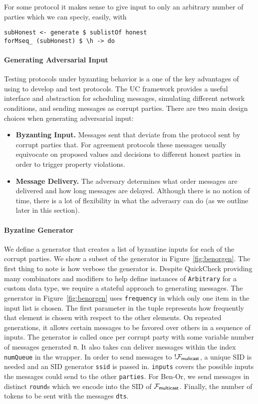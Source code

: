 For some protocol it makes sense to give input to only an arbitrary number of parties which we can speciy, easily, with 
\begin{lstlisting}
subHonest <- generate $ sublistOf honest
forMseq_ (subHonest) $ \h -> do
\end{lstlisting}

\paragraph{Generating Adversarial Input}
Testing protocols under byzanting behavior is a one of the key advantages of using \us to develop and test protocols. 
The UC framework provides a useful interface and abstraction for scheduling messages, simulating different network conditions, and sending messages as corrupt parties.  
There are two main design choices when generating adversarial input:
\begin{itemize}
\item \textbf{Byzanting Input.} Messages sent that deviate from the protocol sent by corrupt parties that. For agreement protocols these messages usually equivocate on proposed values and decisions to different honest parties in order to trigger property violations.
\item \textbf{Message Delivery.} The adversary determines what order messages are delivered and how long messages are delayed. Although there is no notion of time, there is a lot of flexibility in what the adverasry can do (as we outline later in this section).
\end{itemize}

\paragraph{Byzatine Generator}
We define a generator that creates a list of byzantine inputs for each of the corrupt parties.
We show a subset of the generator in Figure~\ref{fig:benorgen}.
The first thing to note is how verbose the generator is.
Despite QuickCheck providing many combinators and modifiers to help define instances of \texttt{Arbitrary} for a custom data type, we require a stateful approach to generating messages.
The generator in Figure~\ref{fig:benorgen} uses \texttt{frequency} in which only one item in the input list is chosen. 
The first parameter in the tuple represents how frequently that element is chosen with respect to the other elements.
On repeated generations, it allows certain messages to be favored over others in a sequence of inputs.
The generator is called once per corrupt party with some variable number of messages generated \texttt{n}. It also takes can deliver messages within the index \texttt{numQueue} in the wrapper.
In order to send messages to $!\mathcal{F}_{{\mathsf {mulicast}}}$, a unique SID is needed and an SID generator \texttt{ssid} is passed in. 
\texttt{inputs} covers the possible inputs the messages could send to the other \texttt{parties}. For Ben-Or, we send messages in distinct \texttt{round}s which we encode into the SID of $\mathcal{F}_{{\mathsf {multicast}}}$. 
Finally, the number of tokens to be sent with the messages \texttt{dts}.

